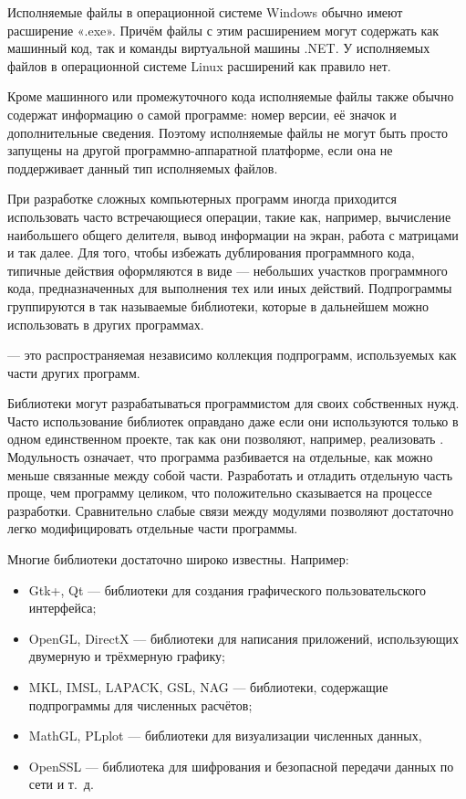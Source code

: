 Исполняемые файлы в операционной системе Windows обычно имеют
расширение «.exe». Причём файлы с этим расширением могут содержать как
машинный код, так и команды виртуальной машины .NET. У исполняемых
файлов в операционной системе Linux расширений как правило нет.

Кроме машинного или промежуточного кода исполняемые файлы также обычно
содержат информацию о самой программе: номер версии, её значок и
дополнительные сведения. Поэтому исполняемые файлы не могут быть
просто запущены на другой программно-аппаратной платформе, если она не
поддерживает данный тип исполняемых файлов.

При разработке сложных компьютерных программ иногда приходится
использовать часто встречающиеся операции, такие как, например,
вычисление наибольшего общего делителя, вывод информации на экран,
работа с матрицами и так далее. Для того, чтобы избежать дублирования
программного кода, типичные действия оформляются в виде
 — небольших участков программного
кода, предназначенных для выполнения тех или иных действий.
Подпрограммы группируются в так называемые библиотеки, которые в
дальнейшем можно использовать в других программах.

\begin{defn}
   — это распространяемая независимо
  коллекция подпрограмм, используемых как части других программ.
\end{defn}

Библиотеки могут разрабатываться программистом для своих собственных
нужд. Часто использование библиотек оправдано даже если они
используются только в одном единственном проекте, так как они
позволяют, например, реализовать . Модульность означает, что программа разбивается на
отдельные, как можно меньше связанные между собой части. Разработать и
отладить отдельную часть проще, чем программу целиком, что
положительно сказывается на процессе разработки. Сравнительно слабые
связи между модулями позволяют достаточно легко модифицировать
отдельные части программы.

Многие библиотеки достаточно широко известны. Например:
\begin{itemize}
\item Gtk+, Qt — библиотеки для создания графического
  пользовательского интерфейса;
\item OpenGL, DirectX — библиотеки для написания приложений,
  использующих двумерную и трёхмерную графику;
\item MKL, IMSL, LAPACK, GSL, NAG — библиотеки, содержащие
  подпрограммы для численных расчётов;
\item MathGL, PLplot — библиотеки для визуализации численных данных,
\item OpenSSL — библиотека для шифрования и безопасной передачи данных
  по сети и т.~д.
\end{itemize}

